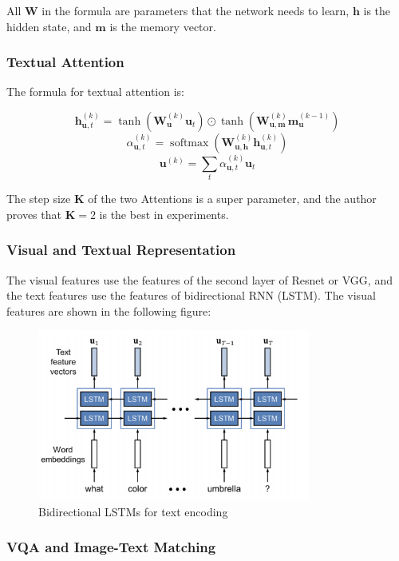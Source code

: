 All $\mathbf{W}$ in the formula are parameters that the network needs to learn, $\mathbf{h}$ is the hidden state, and $\mathbf{m}$ is the memory vector.

\subsubsection{Textual Attention}
The formula for textual attention is:

$$
\mathbf{h}_{\mathbf{u}, t}^{(k)} =\tanh \left(\mathbf{W}_{\mathbf{u}}^{(k)} \mathbf{u}_{t}\right) \odot \tanh \left(\mathbf{W}_{\mathbf{u}, \mathbf{m}}^{(k)} \mathbf{m}_{\mathbf{u}}^{(k-1)}\right)
$$
$$
\alpha_{\mathbf{u}, t}^{(k)}=\operatorname{softmax}\left(\mathbf{W}_{\mathbf{u}, \mathbf{h}}^{(k)} \mathbf{h}_{\mathbf{u}, t}^{(k)}\right)
$$
$$
\mathbf{u}^{(k)}=\sum_{t} \alpha_{\mathbf{u}, t}^{(k)} \mathbf{u}_{t}
$$

The step size $\mathbf{K}$ of the two Attentions is a super parameter, and the author proves that $\mathbf{K}=2$ is the best in experiments.

\subsubsection{Visual and Textual Representation}

The visual features use the features of the second layer of Resnet or VGG, and the text features use the features of bidirectional RNN (LSTM). The visual features are shown in the following figure:

\begin{figure}[h!]
\centering
\includegraphics[width=0.8\textwidth]{dans1.pdf}
\caption{Bidirectional LSTMs for text encoding \cite{dan}}
\label{fig:dan1}
\end{figure}

\subsubsection{VQA and Image-Text Matching}

